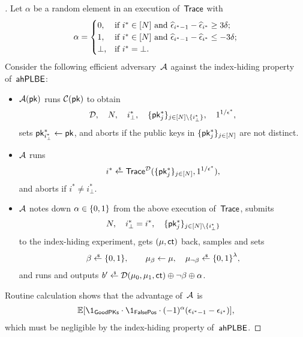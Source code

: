 \begin{proof}[]
Let $\alpha$ be a random element in an execution of~$\Trace$ with
\begin{align*}
\alpha=\begin{cases}
0,&\textup{if }i^\ast\in[N]\textup{ and }
\widehat{\epsilon}_{i^\ast-1}-\widehat{\epsilon}_{i^\ast}\geq 3\delta;\\
1,&\textup{if }i^\ast\in[N]\textup{ and }
\widehat{\epsilon}_{i^\ast-1}-\widehat{\epsilon}_{i^\ast}\leq -3\delta;\\
\bot,&\textup{if }i^\ast=\bot.
\end{cases}
\end{align*}
Consider the following efficient adversary~${\mathcal{A}}$ against the index-hiding property of~$\AHPLBE$:
\begin{itemize}
\item $\scriptA(\pk)$ runs $\scriptC(\pk)$ to obtain
\begin{align*}
\scriptD,\quad
N,\quad
i_\bot^\ast,\quad
\{\pk^\ast_j\}_{j\in{[N]\setminus{\{i_\bot^\ast\}}}},\quad
1^{1/\epsilon^\ast},
\end{align*}
sets ${\pk^\ast_{i_\bot^\ast}\gets\pk}$, and
aborts if the public keys in $\{\pk^\ast_j\}_{j\in[N]}$ are not distinct.
\item ${\mathcal{A}}$ runs
\begin{align*}
i^\ast\draws\Trace^\scriptD(\{\pk^\ast_j\}_{j\in[N]},1^{1/\epsilon^\ast}),
\end{align*}
and aborts if ${i^\ast\neq i_\bot^\ast}$.
\item ${\mathcal{A}}$ notes down ${\alpha\in{\{0,1\}}}$ from the above execution of~$\Trace$,
submits
\begin{align*}
N,\quad
i_\bot^\ast=i^\ast,\quad
\{\pk^\ast_j\}_{j\in[N]\setminus\{i_\bot^\ast\}}
\end{align*}
to the index-hiding experiment,
gets $(\mu,\ct)$ back,
samples and sets
\begin{align*}
\beta\draws\bit,\qquad
\mu_\beta\gets\mu,\quad
\mu_{\neg\beta}\draws\bit^\lambda,
\end{align*}
and runs and outputs
${b'\draws\scriptD(\mu_0,\mu_1,\ct)\oplus\neg\beta\oplus\alpha}$.
\end{itemize}
Routine calculation shows that the advantage of~${\mathcal{A}}$ is
\begin{align*}
\E[\1_\GoodPKs\cdot\1_\FalsePos\cdot(-1)^\alpha(\epsilon_{i^\ast-1}-\epsilon_{i^\ast})],
\end{align*}
which must be negligible by the index-hiding property of~$\AHPLBE$.


\end{proof}
